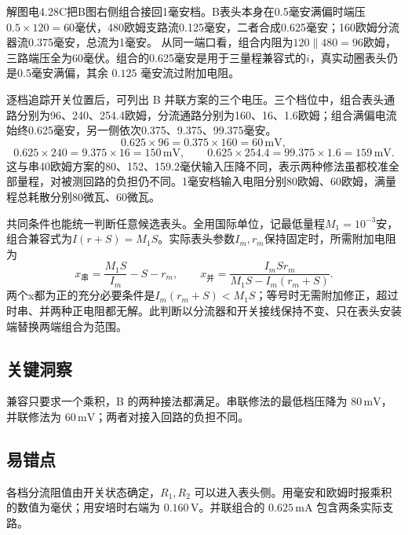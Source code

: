 \documentclass[UTF8,fontset=fandol,a4paper,11pt]{ctexart}
\begin{document}
解图电4.28C把B图右侧组合接回1毫安档。B表头本身在0.5毫安满偏时端压$0.5\times120=60$毫伏，480欧姆支路流0.125毫安，二者合成0.625毫安；160欧姆分流器流0.375毫安，总流为1毫安。
从同一端口看，组合内阻为$120\parallel480=96$欧姆，三路端压全为60毫伏。组合的0.625毫安是用于三量程兼容式的$i$，真实动圈表头仍是0.5毫安满偏，其余 $0.125$ 毫安流过附加电阻。

逐档追踪开关位置后，可列出 B 并联方案的三个电压。三个档位中，组合表头通路分别为96、240、254.4欧姆，分流通路分别为160、16、1.6欧姆；组合满偏电流始终0.625毫安，另一侧依次0.375、9.375、99.375毫安。
\[
0.625\times96=0.375\times160=60\,\mathrm{mV},
\]
\[
0.625\times240=9.375\times16=150\,\mathrm{mV},\qquad
0.625\times254.4=99.375\times1.6=159\,\mathrm{mV}.
\]
这与串40欧姆方案的80、152、159.2毫伏输入压降不同，表示两种修法虽都校准全部量程，对被测回路的负担仍不同。1毫安档输入电阻分别80欧姆、60欧姆，满量程总耗散分别80微瓦、60微瓦。

共同条件也能统一判断任意候选表头。全用国际单位，记最低量程$M_1=10^{-3}$安，组合兼容式为$I(r+S)=M_1S$。实际表头参数$I_m,r_m$保持固定时，所需附加电阻为
\[
x_{\text{串}}=\frac{M_1S}{I_m}-S-r_m,\qquad
x_{\text{并}}=\frac{I_m S r_m}{M_1S-I_m(r_m+S)}.
\]
两个x都为正的充分必要条件是$I_m(r_m+S)<M_1S$；等号时无需附加修正，超过时串、并两种正电阻都无解。此判断以分流器和开关接线保持不变、只在表头安装端替换两端组合为范围。




\subsection*{关键洞察}

兼容只要求一个乘积，B 的两种接法都满足。串联修法的最低档压降为 $80\,\mathrm{mV}$，并联修法为 $60\,\mathrm{mV}$；两者对接入回路的负担不同。



\subsection*{易错点}

各档分流阻值由开关状态确定，$R_1,R_2$ 可以进入表头侧。用毫安和欧姆时报乘积的数值为毫伏；用安培时右端为 $0.160\,\mathrm V$。并联组合的 $0.625\,\mathrm{mA}$ 包含两条实际支路。

\end{document}
